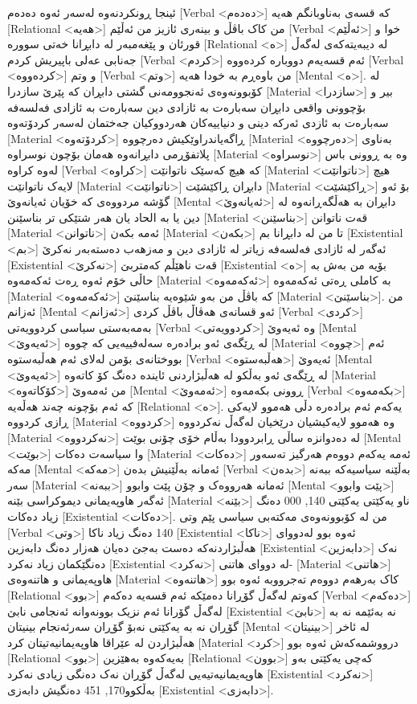 ئینجا ڕونکردنەوە لەسەر ئەوە دەدەم [Verbal <دەدەم>] کە قسەی بەناوبانگم هەیە [Relational <هەیە>] من کاک باڤڵ و بینەری ئازیز من ئەڵێم [Verbal <ئەڵێم>] خوا و قورئان و پێغەمبەر لە دابڕانا خەتی سوورە [Relational <ە>] لە دیبەیتەکەی لەگەڵ جەنابی عەلی باپیریش کردم [Verbal <کردم>] ئەم قسەیەم دووبارە کردەووە [Verbal <کردەووە>] و وتم [Verbal <وتم>] من باوەڕم بە خودا هەیە [Mental <ە>].
لە کۆبوونەوەی ئەنجوومەنی گشتی دابڕان کە پێرێ سازدرا [Material <سازدرا>] بیر و بۆچوونی واقعی دابڕان سەبارەت بە ئازادی دین سەبارەت بە ئازادی فەلسەفە سەبارەت بە ئازدی ئەرکە دینی و دنیاییەکان هەردووکیان جەختمان لەسەر کردۆتەوە [Material <کردۆتەوە>] ڕاگەیاندراوێکیش دەرچووە [Material <دەرچووە>] بەناوی پلاتفۆڕمی دابڕانەوە هەمان بۆچون نوسراوە [Material <نوسراوە>] وە بە ڕوونی باس لەوە کراوە [Verbal <کراوە>] کە هیچ کەسێک ناتوانێت [Material <ناتوانێت>] هیچ لایەک ناتوانێت [Material <ناتوانێت>] دابڕان ڕاکێشێت [Material <ڕاکێشێت>] بۆ ئەو گۆشە مردووەی کە خۆیان ئەیانەوێ [Mental <ئەیانەوێ>] دابڕان بە هەڵگەڕانەوە لە دین یا بە الحاد یان هەر شتێکی تر بناسێنن [Material <بناسێنن>] قەت ناتوانن [Material <ناتوانن>] ئەمە بکەن [Material <بکەن>] تا من لە دابڕانا بم [Existential <بم>] ئەگەر لە ئازادی فەلسەفە زیاتر لە ئازادی دین و مەزهەب دەستەبەر نەکرێ [Existential <نەکرێ>] قەت ناهێڵم کەمتربێ [Existential <ە>] بۆیە من بەش بە حاڵی خۆم ئەوە ڕەت ئەکەمەوە [Material <ئەکەمەوە>] بە کاملی ڕەتی ئەکەمەوە [Material <ئەکەمەوە>] کە باڤڵ من بەو شێوەیە بناسێنێ [Material <بناسێنێ>].
من ئەزانم [Mental <ئەزانم>] ئەو قسانەی هەڤاڵ باڤڵ کردی [Verbal <کردی>] بەمەبەستی سیاسی کردوویەتی [Verbal <کردوویەتی>] وە ئەیەوێ [Mental <ئەیەوێ>] لە ڕێگەی ئەو برادەرە سەلەفییەیی کە چووە [Material <چووە>] ئەم بووختانەی بۆمن لەلای ئەم هەڵبەستوە [Verbal <هەڵبەستوە>] ئەیەوێ [Mental <ئەیەوێ>] لە ڕێگەی ئەو بەڵکو لە هەڵبژاردنی ئایندە دەنگ کۆ کاتەوە [Material <کۆکاتەوە>] من ئەمەوێ [Mental <ئەمەوێ>] ڕوونی بکەمەوە [Verbal <بکەمەوە>] کە ئەم بۆچونە چەند هەڵەیە [Relational <ە>].
یەکەم ئەم برادەرە دڵی هەموو لایەکی ڕازی کردووە [Material <کردووە>] وە هەموو لایەکیشیان درێخیان لەگەڵ نەکردووە [Material <نەکردووە>] لە دەدوانزە ساڵی ڕابردوودا بەڵام خۆی چۆنی بوێت [Mental <بوێت>] وا سیاسەت دەکات [Material <دەکات>] ئەمە یەکەم دووەم هەرگیز تەسەور مەکە [Mental <مەکە>] ئەمانە بەڵێنیش بدەن [Verbal <بدەن>] بەڵێنە سیاسیەکە ببەنە سەر [Material <ببەنە>] ئەمانە هەرووەک و چۆن پێت وابوو [Mental <پێت وابوو>] ئەگەر هاوپەیمانی دیموکراسی بێنە [Material <بێنە>] ناو یەکێتی یەکێتی 140, 000 دەنگ زیاد دەکات [Existential <دەکات>].
من لە کۆبوونەوەی مەکتەبی سیاسی پێم وتی [Verbal <وتی>] 140 دەنگ زیاد ناکا [Existential <ناکا>] ئەوە بوو لەدووای هەڵبژاردنەکە دەست بەجێ دەیان هەزار دەنگ دابەزین [Existential <دابەزین>] نەک دەنگێکمان زیاد نەکرد [Existential <نەکرد>] لە دووای هاتنی- [Material <هاتنی>] هاوپەیمانی و هاتنەوەی [Material <هاتنەوە>] کاک بەرهەم دووەم تەجرووبە ئەوە بوو [Relational <بوو>] کەوتم لەگەڵ گۆڕانا دەمێکە ئەم قسەیە دەکەم [Verbal <دەکەم>] لەگەڵ گۆرانا ئەم نزیک بوونەوانە ئەنجامی نابێ [Existential <نابێ>] نە بەئێمە نە بە گۆڕان نە بە یەکێتی نەبۆ گۆڕان سەرئەنجام بینیتان [Mental <بینیتان>] لە ئاخر هەڵبژاردن لە عێراقا هاوپەیمانیەتیتان کرد [Material <کرد>] درووشمەکەش ئەوە بوو [Relational <بوو>] بەیەکەوە بەهێزین [Relational <بوون>] کەچی یەکێتی بەو هاوپەیمانیەتیەیی لەگەڵ گۆڕان نەک دەنگی زیادی نەکرد [Existential <نەکرد>] بەڵکوو170, 451 دەنگیش دابەزی [Existential <دابەزی>].
